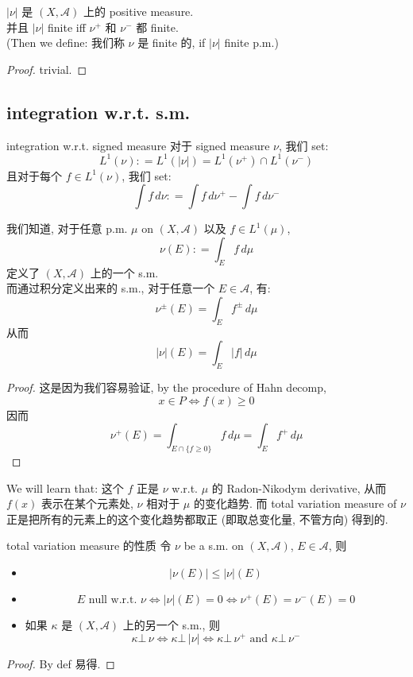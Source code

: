 \documentclass[lang=cn,11pt]{elegantbook}
\begin{document}
\begin{lemma}
    $ |\nu |$  是 $(X,\mathcal{A})$ 上的 positive measure.\\
    并且 $|\nu |$ finite iff $\nu^+$ 和 $\nu^-$ 都 finite.\\
   (Then we define: 我们称 $\nu$ 是 finite 的, if $|\nu|$ finite p.m.)
\end{lemma}
\begin{proof}
    trivial.
\end{proof}


\subsection{integration w.r.t. s.m.}
\begin{definition}{integration w.r.t. signed measure}
    对于 signed measure $\nu$, 我们 set: \[
    L^1(\nu) : = L^1(|\nu|) = L^1(\nu^+)
 \cap L^1 (\nu^-)    \]
且对于每个 $f\in L^1 (\nu)$, 我们 set: \[
\int f \,d\nu : = \int f \,d \nu^+  - \int f \,d \nu^-
\]
\end{definition}


\begin{proposition}
  我们知道, 对于任意 p.m. $\mu$ on $(X,\mathcal{A})$ 以及 $f \in L^1 (\mu)$, \[
    \nu(E) : = \int_E f \, d\mu
    \]
    定义了 $(X,\mathcal{A})$ 上的一个 s.m.\\
    而通过积分定义出来的 s.m., 对于任意一个 $E\in\mathcal{A}$, 有: \[
    \nu^{\pm} (E)  =  \int_E f^{\pm}\, d\mu
    \]从而 \[
    | \nu| (E)  = \int_E |f| \, d\mu
    \]
\end{proposition}
\begin{proof}
    这是因为我们容易验证, by the procedure of Hahn decomp,  \[
    x \in P \iff f(x) \geq 0
    \]
    因而 \[
    \nu^+(E)  = \int_{E \cap \{ f\geq 0\}} f\, d\mu = \int_E f^+ \, d\mu
    \]
\end{proof}
We will learn that: 这个 $f$ 正是 $\nu$ w.r.t. $\mu$ 的 Radon-Nikodym derivative, 从而 $f(x)$ 表示在某个元素处, $\nu$ 相对于 $\mu$ 的变化趋势. 而 total variation measure of $\nu$ 正是把所有的元素上的这个变化趋势都取正 (即取总变化量, 不管方向) 得到的.





\begin{lemma}{total variation measure 的性质}
令 $\nu$ be a s.m. on $(X,\mathcal{A})$, $E\in \mathcal{A}$, 则 
\begin{itemize}
    \item \[  |\nu(E) | \leq |\nu |(E) \]
    \item  \[  E \text{ null w.r.t. } \nu \iff  |\nu|(E) = 0 \iff \nu^+(E) = \nu^-(E) = 0\]
    \item 如果 $\kappa$ 是 $(X,\mathcal{A} )$ 上的另一个 s.m., 则 \[ \kappa \bot \, \nu \iff \kappa \bot \, |\nu| \iff \kappa \bot \, \nu^+ \text{ and } \kappa \bot \, \nu^-   \]
\end{itemize}      
\end{lemma}
\begin{proof}
    By def 易得.
\end{proof}
\end{document}
